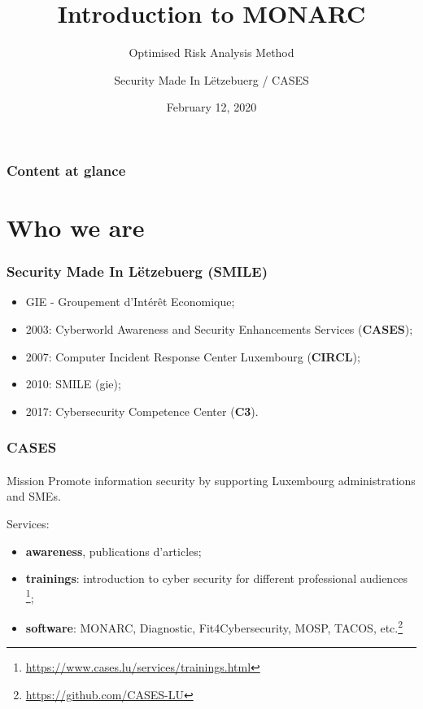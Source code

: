 \documentclass[]{beamer}
\title[Introduction to MONARC]{Introduction to MONARC}
\subtitle{Optimised Risk Analysis Method}
\author[Team CASES]{Security Made In Lëtzebuerg / CASES}
\institute[]{\href{https://www.cases.lu}{Cyberworld Awareness and Security Enhancements Services}}
\date{February 12, 2020}
\begin{document}
\begin{frame}
    \titlepage
\end{frame}


\setcounter{tocdepth}{1}
\begin{frame}
    \frametitle{Content at glance}
    \tableofcontents
\end{frame}
\setcounter{tocdepth}{4}




%
%
\section{Who we are}
\begin{frame}
    \frametitle{Security Made In Lëtzebuerg (SMILE)}
    \begin{center}
        \begin{itemize}
            \item GIE - Groupement d’Intérêt Economique;
            \item 2003: Cyberworld Awareness and Security Enhancements Services (\textbf{CASES});
            \item 2007: Computer Incident Response Center Luxembourg (\textbf{CIRCL});
            \item 2010: SMILE (gie);
            \item 2017: Cybersecurity Competence Center (\textbf{C3}).
        \end{itemize}
    \end{center}
\end{frame}

\begin{frame}
    \frametitle{CASES}
    \framesubtitle{}
    \begin{block}{Mission}
        Promote information security by supporting Luxembourg administrations and SMEs.
    \end{block}
    Services:
    \begin{center}
        \begin{itemize}
            \item \textbf{awareness}, publications d'articles;
            \item \textbf{trainings}:
                introduction to cyber security for different professional audiences \footnote{\url{https://www.cases.lu/services/trainings.html}};
            \item \textbf{software}:
                MONARC, Diagnostic, Fit4Cybersecurity, MOSP, TACOS, etc.\footnote{\url{https://github.com/CASES-LU}}
        \end{itemize}
    \end{center}
\end{frame}
\end{document}
